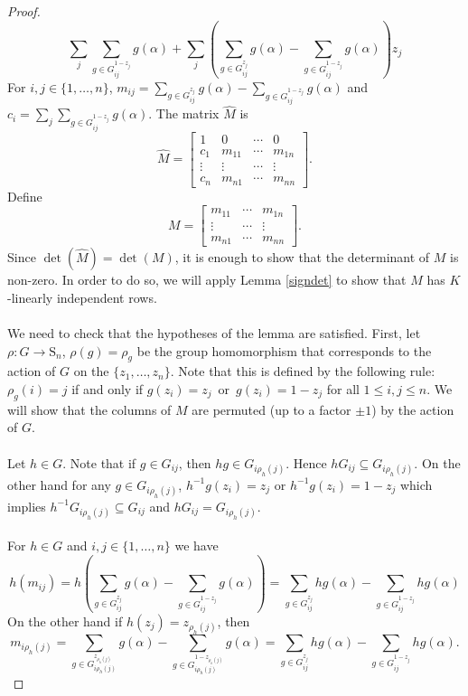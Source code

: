 \documentclass{article}
\theoremstyle{plain}
\theoremstyle{definition}
\begin{document}
\begin{proof}
$$\sum_{j}\sum_{g\in G^{1-z_j}_{ij}}g(\alpha)+ \sum_{j}(\sum_{g\in G^{z_j}_{ij}}g(\alpha) -\sum_{g\in G^{1-z_j}_{ij}}g(\alpha))z_j $$
For $i,j \in \lbrace1, \ldots , n \rbrace$, $m_{ij} = \sum_{g\in G^{z_j}_{ij}}g(\alpha) -\sum_{g\in G^{1-z_j}_{ij}}g(\alpha)$ and $c_i = \sum_{j}\sum_{g\in G^{1-z_j}_{ij}}g(\alpha)$. The matrix $\hat{M}$ is 
$$\hat{M} = \begin{bmatrix}
1 & 0 & \cdots & 0\\
c_1 & m_{11} & \cdots & m_{1n}\\
\vdots & \vdots & \cdots & \vdots\\
c_{n} & m_{n1} & \cdots	& m_{nn}
\end{bmatrix}.
$$
Define  
$$M = \begin{bmatrix}
 m_{11} & \cdots & m_{1n}\\
 \vdots & \cdots & \vdots\\
 m_{n1} & \cdots	& m_{nn}
\end{bmatrix}.$$
Since $\det(\hat{M}) = \det (M)$, it is enough to show that the determinant of $M$ is non-zero. In order to do so, we will apply Lemma \ref{signdet} to show that $M$ has $K$-linearly independent rows. \\
\\
We need to check that the hypotheses of the lemma are satisfied. First, let $\rho: G \longrightarrow \mathrm{S}_n$, $\rho(g) = \rho_g$ be the group homomorphism that corresponds to the action of $G$ on the $\lbrace z_1, \ldots , z_n \rbrace$. Note that this is defined by the following rule: $\rho_g(i) = j$ if and only if $g(z_i) = z_j \,\,\, \text{or} \,\,\, g(z_i) = 1- z_j$ for all $1 \leq i,j\leq n$. We will show that the columns of $M$ are permuted (up to a factor $\pm 1$) by the action of $G$. \\
\\
Let $h \in G$. Note that if $g \in G_{ij}$, then $hg \in G_{i\rho_h(j)}$. Hence $hG_{ij} \subseteq G_{i\rho_h(j)}$. On the other hand for any $g \in G_{i\rho_h(j)}$, $h^{-1}g(z_i) = z_j$ or $h^{-1}g(z_i) = 1- z_j$ which implies $h^{-1}G_{i\rho_h(j)} \subseteq G_{ij}$ and $hG_{ij} = G_{i\rho_h(j)}$.\\
\\
For $h \in G$ and $i,j \in \lbrace 1, \ldots , n \rbrace$ we have
$$h(m_{ij}) = h( \sum_{g\in G^{z_j}_{ij}}g(\alpha) -\sum_{g\in G^{1-z_j}_{ij}}g(\alpha)) =  \sum_{g\in G^{z_j}_{ij}}hg(\alpha) -\sum_{g\in G^{1-z_j}_{ij}}hg(\alpha)$$
On the other hand if $h(z_j) = z_{\rho_h(j)}$, then
$$m_{i\rho_h(j)} =  \sum_{g\in G^{z_{\rho_h(j)}}_{i\rho_h(j)}}g(\alpha) -\sum_{g\in G^{1-z_{\rho_h(j)}}_{i\rho_h(j)}}g(\alpha) = \sum_{g\in G^{z_j}_{ij}}hg(\alpha) -\sum_{g\in G^{1-z_{j}}_{ij}}hg(\alpha).$$

\end{proof}
\end{document}
